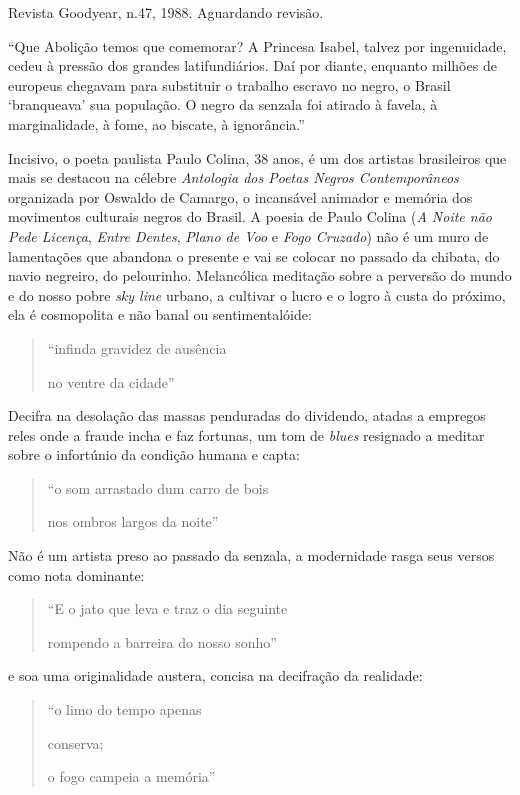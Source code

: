 \documentclass[
  letterpaper,
  DIV=11,
  numbers=noendperiod]{scrreprt}
\begin{document}
Revista Goodyear, n.47, 1988. Aguardando revisão.

\hfill\break

``Que Abolição temos que comemorar? A Princesa Isabel, talvez por
ingenuidade, cedeu à pressão dos grandes latifundiários. Daí por diante,
enquanto milhões de europeus chegavam para substituir o trabalho escravo
no negro, o Brasil `branqueava' sua população. O negro da senzala foi
atirado à favela, à marginalidade, à fome, ao biscate, à ignorância.''

Incisivo, o poeta paulista Paulo Colina, 38 anos, é um dos artistas
brasileiros que mais se destacou na célebre \emph{Antologia dos Poetas
Negros Contemporâneos} organizada por Oswaldo de Camargo, o incansável
animador e memória dos movimentos culturais negros do Brasil. A poesia
de Paulo Colina (\emph{A Noite não Pede Licença}, \emph{Entre Dentes},
\emph{Plano de Voo} e \emph{Fogo Cruzado}) não é um muro de lamentações
que abandona o presente e vai se colocar no passado da chibata, do navio
negreiro, do pelourinho. Melancólica meditação sobre a perversão do
mundo e do nosso pobre \emph{sky line} urbano, a cultivar o lucro e o
logro à custa do próximo, ela é cosmopolita e não banal ou
sentimentalóide:

\begin{quote}
``infinda gravidez de ausência~

no ventre da cidade''
\end{quote}

Decifra na desolação das massas penduradas do dividendo, atadas a
empregos reles onde a fraude incha e faz fortunas, um tom de
\emph{blues} resignado a meditar sobre o infortúnio da condição humana e
capta:

\begin{quote}
``o som arrastado dum carro de bois~

nos ombros largos da noite''
\end{quote}

Não é um artista preso ao passado da senzala, a modernidade rasga seus
versos como nota dominante:

\begin{quote}
``E o jato que leva e traz o dia seguinte~

rompendo a barreira do nosso sonho''
\end{quote}

e soa uma originalidade austera, concisa na decifração da realidade:

\begin{quote}
``o limo do tempo apenas~

conserva;~

o fogo campeia a memória''
\end{quote}
\end{document}
